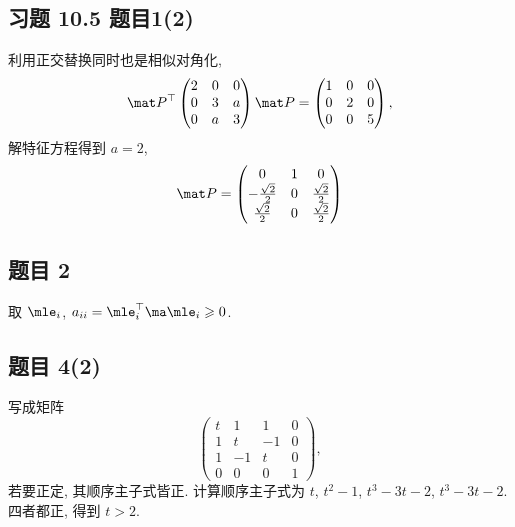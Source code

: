 \subsection*{ 习题 10.5 题目1(2) }
\begin{solution}
利用正交替换同时也是相似对角化, 
\[
\mpp ^\top \left(\begin{matrix}
    2 & 0 & 0 \\
    0 & 3 & a \\
    0 & a & 3
    \end{matrix}\right) \mpp = \left(\begin{matrix}
        1 & 0 & 0 \\
        0 & 2 & 0 \\
        0 & 0 & 5
        \end{matrix}\right),
\]
解特征方程得到 $a = 2$, 
\[
\mpp = \left(\begin{matrix}
    0 & 1 & 0 \\
    -\frac{\sqrt{2}}{2} & 0 & \frac{\sqrt{2}}{2} \\
    \frac{\sqrt{2}}{2} & 0 & \frac{\sqrt{2}}{2}
    \end{matrix}\right)
\]
\end{solution}

\subsection*{ 题目 2 }
\begin{solution}
取 $\mle_i$, $a_{ii} = \mle_i^\top \ma \mle_i \geqslant 0$.
\end{solution}

\subsection*{ 题目 4(2) }
\begin{solution}
写成矩阵
\[
    \left(\begin{matrix}
        t & 1 & 1 & 0 \\
        1 & t & -1 & 0 \\
        1 & -1 & t & 0 \\
        0 & 0 & 0 & 1
        \end{matrix}\right),
\]
若要正定, 其顺序主子式皆正. 计算顺序主子式为 $t$, $t^2 - 1$, $t^3 - 3t - 2$, $t^3 - 3t - 2$. 四者都正, 得到 $t > 2$.
\end{solution}

